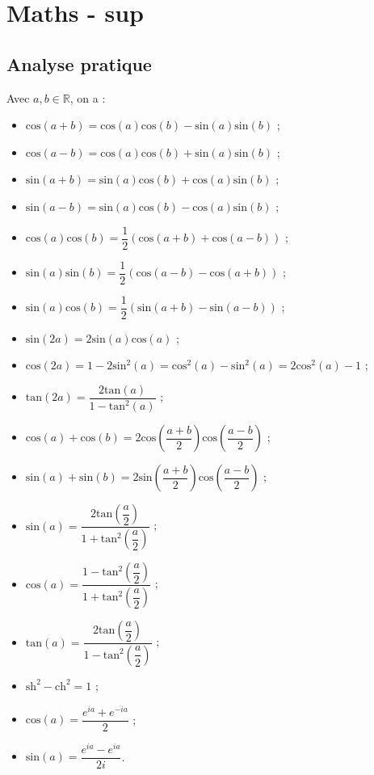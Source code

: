 \documentclass[a4paper,12pt]{book}
\def\R{\mathbb{R}}
\begin{document}
\tableofcontents
\chapter{Maths - sup}
\section{Analyse pratique}
\begin{tcolorbox}[colback=white,colframe=black,title=Formulaire de trigo] 
Avec $a,b\in\R$, on a :\begin{itemize}
\item $\mathrm{cos}(a+b) = \mathrm{cos}(a)\mathrm{cos}(b) - \mathrm{sin}(a)\mathrm{sin}(b)$ ;
\item $\mathrm{cos}(a-b) = \mathrm{cos}(a)\mathrm{cos}(b) + \mathrm{sin}(a)\mathrm{sin}(b)$ ;
\item $\mathrm{sin}(a+b) = \mathrm{sin}(a)\mathrm{cos}(b) + \mathrm{cos}(a)\mathrm{sin}(b)$ ;
\item $\mathrm{sin}(a-b) = \mathrm{sin}(a)\mathrm{cos}(b) - \mathrm{cos}(a)\mathrm{sin}(b)$ ;
\item $\mathrm{cos}(a)\mathrm{cos}(b) = \dfrac{1}{2}\left(\mathrm{cos}(a+b) + \mathrm{cos}(a-b)\right)$ ;
\item $\mathrm{sin}(a)\mathrm{sin}(b) = \dfrac{1}{2}\left(\mathrm{cos}(a-b) - \mathrm{cos}(a+b)\right)$ ;
\item $\mathrm{sin}(a)\mathrm{cos}(b) = \dfrac{1}{2}\left(\mathrm{sin}(a+b)-\mathrm{sin}(a-b)\right)$ ;
\item $\mathrm{sin}(2a) = 2\mathrm{sin}(a)\mathrm{cos}(a)$ ;
\item $\mathrm{cos}(2a) = 1 - 2\mathrm{sin}^2(a) = \mathrm{cos}^2(a) - \mathrm{sin}^2(a) = 2\mathrm{cos}^2(a) - 1$ ;
\item $\mathrm{tan}(2a) = \dfrac{2\mathrm{tan}(a)}{1-\mathrm{tan}^2(a)}$ ;
\item $\mathrm{cos}(a) + \mathrm{cos}(b) = 2\mathrm{cos}\left(\dfrac{a+b}{2}\right)\mathrm{cos}\left(\dfrac{a-b}{2}\right)$ ;
\item $\mathrm{sin}(a) + \mathrm{sin}(b) = 2\mathrm{sin}\left(\dfrac{a+b}{2}\right)\mathrm{cos}\left(\dfrac{a-b}{2}\right)$ ;
\item $\mathrm{sin}(a) = \dfrac{2\mathrm{tan}\left(\dfrac{a}{2}\right)}{1+\mathrm{tan}^2\left(\dfrac{a}{2}\right)}$ ;
\item $\mathrm{cos}(a) = \dfrac{1-\mathrm{tan}^2\left(\dfrac{a}{2}\right)}{1+\mathrm{tan}^2\left(\dfrac{a}{2}\right)}$ ;
\item $\mathrm{tan}(a) = \dfrac{2\mathrm{tan}\left(\dfrac{a}{2}\right)}{1-\mathrm{tan}^2\left(\dfrac{a}{2}\right)}$ ;
\item $\mathrm{sh}^2 - \mathrm{ch}^2 = 1$ ;
\item $\mathrm{cos}(a) = \dfrac{e^{ia} + e^{-ia}}{2}$ ;
\item $\mathrm{sin}(a) = \dfrac{e^{ia} - e^{ia}}{2i}$.
\end{itemize}
\end{tcolorbox}
\end{document}
